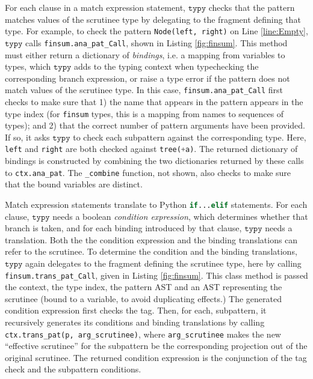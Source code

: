 \documentclass[preprint,10pt]{sigplanconf}
\newcommand{\typy}{\texttt{typy}}
\newcommand{\lip}[1]{\lstinline[language=Python,basicstyle=\ttfamily\footnotesize,deletendkeywords={tuple,buffer,map}]{#1}}
\newcommand{\li}[1]{\lip{#1}}
\begin{document}
For each clause in a match expression statement, $\typy$ checks that the pattern matches values of the scrutinee type by delegating to the fragment defining that type. For example, to check the pattern \li{Node(left, right)} on Line \ref{line:Empty}, $\typy$ calls \li{finsum.ana_pat_Call}, shown in Listing \ref{fig:finsum}. This method must either return a dictionary of \emph{bindings}, i.e. a mapping from variables to types, which $\typy$ adds to the typing context when typechecking the corresponding branch expression, or raise a type error if the pattern does not match values of the scrutinee type. In this case, \li{finsum.ana_pat_Call} first checks to make sure that 1) the name that appears in the pattern appears in the type index (for \li{finsum} types, this is a mapping from names to sequences of types); and 2) that the correct number of pattern arguments have been provided. If so, it asks $\typy$ to check each subpattern against the corresponding type. Here, \li{left} and \li{right} are both checked against \li{tree(+a)}. The returned dictionary of bindings is constructed by combining the two dictionaries returned by these calls to \li{ctx.ana_pat}. The \li{_combine} function, not shown, also checks to make sure that the bound variables are distinct.



Match expression statements translate to Python \li{if...elif} statements. For each clause, $\typy$ needs a boolean \emph{condition expression}, which determines whether that branch is taken, and for each binding introduced by that clause, $\typy$ needs a translation. Both the the condition expression and the binding translations can refer to the scrutinee. To determine the condition and the binding translations, $\typy$ again delegates to the fragment defining the scrutinee type, here by calling \li{finsum.trans_pat_Call}, given in Listing \ref{fig:finsum}. This class method is passed the context, the type index, the pattern AST and an AST representing the scrutinee (bound to a variable, to avoid duplicating effects.) The generated condition expression first checks the tag. Then, for each, subpattern, it recursively generates its conditions and binding translations by calling \li{ctx.trans_pat(p, arg_scrutinee)}, where \li{arg_scrutinee} makes the new ``effective scrutinee'' for the subpattern be the corresponding projection out of the original scrutinee. The returned condition expression is the conjunction of the tag check and the subpattern conditions.
\end{document}
